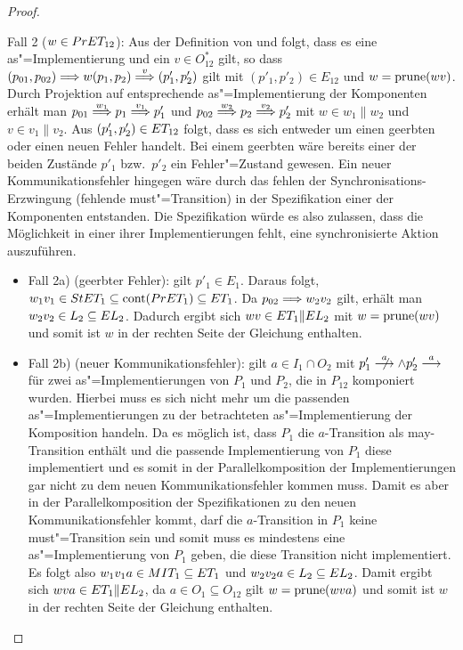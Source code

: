 \begin{proof}
\begin{itemize}
      Fall 2 ($w\in PrET _{12}$): Aus der Definition von \PrET{} und \prune{}
      folgt, dass es eine as"=Implementierung und ein $v\in O_{12}^*$ gilt, so
      dass $(p_{01},p_{02}) \weakmust{w} (p_1,p_2) \weakmust[v] (p'_1,p'_2)$
      gilt mit $(p'_1,p'_2)\in E_{12}$ und $w=\mathrm{prune} (wv)$. Durch Projektion
      auf entsprechende as"=Implementierung der Komponenten erhält man $p_{01}
      \weakmust[w_1] p_1 \weakmust[v_1] p'_1$ und $p_{02} \weakmust[w_2] p_2
      \weakmust[v_2] p'_2$ mit $w\in w_1\|w_2$ und $v\in v_1\|v_2$. Aus
      $(p'_1,p'_2)\in ET _{12}$ folgt, dass es sich entweder um einen geerbten
      oder einen neuen Fehler handelt. Bei einem geerbten wäre
      bereits einer der beiden Zustände $p'_1$ bzw.\ $p'_2$ ein
      Fehler"=Zustand gewesen. Ein neuer Kommunikationsfehler
      hingegen wäre durch das fehlen der Synchronisations-Erzwingung (fehlende
      must"=Transition) in der Spezifikation einer der Komponenten entstanden.
      Die Spezifikation würde es also zulassen, dass die Möglichkeit in einer
      ihrer Implementierungen fehlt, eine synchronisierte Aktion auszuführen.
    \begin{itemize}
      \item Fall 2a) (geerbter Fehler): \OBdA{} gilt $p'_1\in
        E_1$. Daraus folgt, $w_1v_1\in StET_1 \subseteq \mathrm{cont} (PrET _1)
        \subseteq ET _1$. Da $p_{02} \weakmust{w_2v_2}$ gilt, erhält man
        $w_2v_2\in L_2\subseteq EL _2$. Dadurch ergibt sich $wv\in ET _1\|EL
        _2$ mit $w=\mathrm{prune} (wv)$ und somit ist $w$ in der rechten Seite der
        Gleichung enthalten.
      \item Fall 2b) (neuer Kommunikationsfehler): \OBdA{} gilt $a\in I_1\cap
        O_2$ mit $p'_1\nmust[a]\land p'_2\must[a]$ für zwei
        as"=Implementierungen von $P_1$ und $P_2$, die in $P_{12}$ komponiert
        wurden. Hierbei muss es sich nicht mehr um die passenden
        as"=Implementierungen zu der betrachteten as"=Implementierung der
        Komposition handeln. Da es möglich ist, dass $P_1$ die $a$-Transition
        als may-Transition enthält und die passende Implementierung von $P_1$
        diese implementiert und es somit in der Parallelkomposition der
        Implementierungen gar nicht zu dem neuen Kommunikationsfehler kommen
        muss. Damit es aber in der Parallelkomposition der Spezifikationen zu
        den neuen Kommunikationsfehler kommt, darf die $a$-Transition in $P_1$
        keine must"=Transition sein und somit muss es mindestens eine
        as"=Implementierung von $P_1$ geben, die diese Transition nicht
        implementiert.\\
        Es folgt also $w_1v_1a\in MIT _1 \subseteq ET _1$ und $w_2v_2a\in L_2
        \subseteq EL _2$. Damit ergibt sich $wva\in ET _1\|EL_2$, da $a\in
        O_1\subseteq O_{12}$ gilt $w=\mathrm{prune} (wva)$ und somit ist $w$ in der
        rechten Seite der Gleichung enthalten.
    \end{itemize}
  \end{itemize}


\end{proof}
